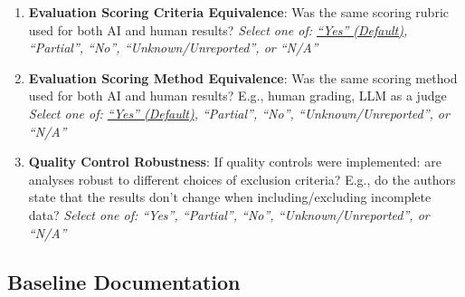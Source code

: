 \documentclass{article}
\begin{document}
\begin{enumerate}[leftmargin=30pt, topsep=0pt, itemsep=0pt]
    \item \textbf{Evaluation Scoring Criteria Equivalence}: Was the same scoring rubric used for both AI and human results?
    \newline \textit{Select one of: \ul{``Yes'' (Default)}, ``Partial'', ``No'', ``Unknown/Unreported'', or ``N/A''}
    
    \item \textbf{Evaluation Scoring Method Equivalence}: Was the same scoring method used for both AI and human results? E.g., human grading, LLM as a judge
    \newline \textit{Select one of: \ul{``Yes'' (Default)}, ``Partial'', ``No'', ``Unknown/Unreported'', or ``N/A''}
    
    \item \textbf{Quality Control Robustness}: If quality controls were implemented: are analyses robust to different choices of exclusion criteria? E.g., do the authors state that the results don't change when including/excluding incomplete data?
    \newline \textit{Select one of: ``Yes'', ``Partial'', ``No'', ``Unknown/Unreported'', or ``N/A''}
\end{enumerate}

\subsection{Baseline Documentation}

\renewcommand{\labelenumi}{5.\arabic{enumi}}
\renewcommand{\labelenumii}{5.\arabic{enumi}.\arabic{enumii}}
\renewcommand{\labelenumiii}{5.\arabic{enumi}.\arabic{enumii}.\arabic{enumiii}}
\end{document}
